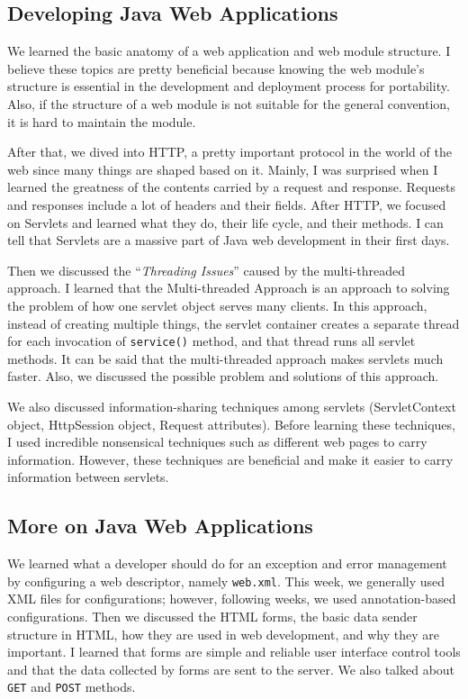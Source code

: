 \subsection{Developing Java Web Applications}

We learned the basic anatomy of a web application and web module structure. I believe these topics are pretty beneficial because knowing the web module's structure is essential in the development and deployment process for portability. Also, if the structure of a web module is not suitable for the general convention, it is hard to maintain the module.

After that, we dived into HTTP, a pretty important protocol in the world of the web since many things are shaped based on it. Mainly, I was surprised when I learned the greatness of the contents carried by a request and response. Requests and responses include a lot of headers and their fields. After HTTP, we focused on Servlets and learned what they do, their life cycle, and their methods. I can tell that Servlets are a massive part of Java web development in their first days. 

Then we discussed the ``\textit{Threading Issues}'' caused by the multi-threaded approach. I learned that the Multi-threaded Approach is an approach to solving the problem of how one servlet object serves many clients. In this approach, instead of creating multiple things, the servlet container creates a separate thread for each invocation of \texttt{service()} method, and that thread runs all servlet methods. It can be said that the multi-threaded approach makes servlets much faster. Also, we discussed the possible problem and solutions of this approach.

We also discussed information-sharing techniques among servlets (ServletContext object, HttpSession object, Request attributes). Before learning these techniques, I used incredible nonsensical techniques such as different web pages to carry information. However, these techniques are beneficial and make it easier to carry information between servlets.

\subsection{More on Java Web Applications}

We learned what a developer should do for an exception and error management by configuring a web descriptor, namely \texttt{web.xml}. This week, we generally used XML files for configurations; however, following weeks, we used annotation-based configurations. Then we discussed the HTML forms, the basic data sender structure in HTML, how they are used in web development, and why they are important. I learned that forms are simple and reliable user interface control tools and that the data collected by forms are sent to the server. We also talked about \texttt{GET} and \texttt{POST} methods.

